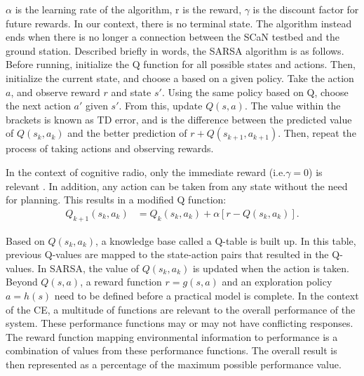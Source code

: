 		\par $\alpha$ is the learning rate of the algorithm, r is the reward, $\gamma$ is the discount factor for future rewards. In our context, there is no terminal state. The algorithm instead ends when there is no longer a connection between the SCaN testbed and the ground station. Described briefly in words, the SARSA algorithm is as follows. Before running, initialize the Q function for all possible states and actions. Then, initialize the current state, and choose a based on a given policy. Take the action $a$, and observe reward $r$ and state $s'$. Using the same policy based on Q, choose the next action $a'$ given $s'$. From this, update $Q(s,a)$. The value within the brackets is known as TD error, and is the difference between the predicted value of $Q(s_k,a_k)$ and the better prediction of $r + Q(s_{k+1},a_{k+1})$. Then, repeat the process of taking actions and observing rewards. 
	\par In the context of cognitive radio, only the immediate reward (i.e.$\gamma = 0$) is relevant \cite{AIAA_Paper}. In addition, any action can be taken from any state without the need for planning. This results in a modified Q function:
	\begin{align}
		Q_{k+1}(s_k,a_k) &= Q_k(s_k,a_k) + \alpha[r - Q(s_k,a_k)]. \label{eq:bg_sarsa2}
	\end{align}
	\par Based on $Q(s_k,a_k)$, a knowledge base called a Q-table is built up. In this table, previous Q-values are mapped to the state-action pairs that resulted in the Q-values. In SARSA, the value of $Q(s_k,a_k)$ is updated when the action is taken. Beyond $Q(s,a)$, a reward function $r = g(s,a)$ and an exploration policy $a = h(s)$ need to be defined before a practical model is complete. In the context of the CE, a multitude of functions are relevant to the overall performance of the system. These performance functions may or may not have conflicting responses. The reward function mapping environmental information to performance is a combination of values from these performance functions. The overall result is then represented as a percentage of the maximum possible performance value. 
	
